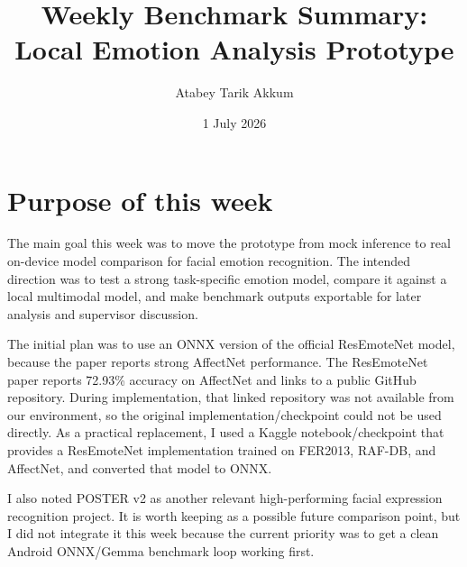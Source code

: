 \documentclass[11pt,a4paper]{article}
\title{Weekly Benchmark Summary: Local Emotion Analysis Prototype}
\author{Atabey Tarik Akkum}
\date{1 July 2026}
\begin{document}
\maketitle

\section*{Purpose of this week}
The main goal this week was to move the prototype from mock inference to real on-device model comparison for facial emotion recognition. The intended direction was to test a strong task-specific emotion model, compare it against a local multimodal model, and make benchmark outputs exportable for later analysis and supervisor discussion.

The initial plan was to use an ONNX version of the official ResEmoteNet model, because the paper reports strong AffectNet performance. The ResEmoteNet paper reports 72.93\% accuracy on AffectNet and links to a public GitHub repository. During implementation, that linked repository was not available from our environment, so the original implementation/checkpoint could not be used directly. As a practical replacement, I used a Kaggle notebook/checkpoint that provides a ResEmoteNet implementation trained on FER2013, RAF-DB, and AffectNet, and converted that model to ONNX.

I also noted POSTER v2 as another relevant high-performing facial expression recognition project. It is worth keeping as a possible future comparison point, but I did not integrate it this week because the current priority was to get a clean Android ONNX/Gemma benchmark loop working first.
\end{document}
